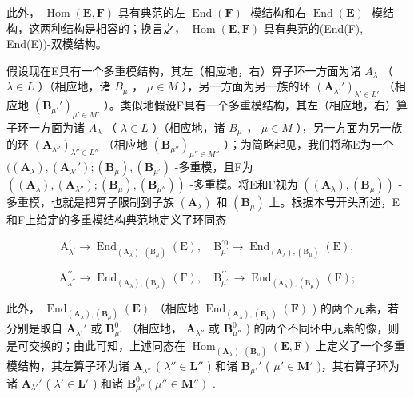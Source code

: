 此外， \(\operatorname{Hom}(\mathbf{E},\mathbf{F})\) 具有典范的左 \(\operatorname{End}(\mathbf{F})\) -模结构和右 \(\operatorname{End}(\mathbf{E})\) -模结构，这两种结构是相容的；换言之， \(\operatorname{Hom}(\mathbf{E},\mathbf{F})\) 具有典范的(End(F), End(E))-双模结构。

假设现在E具有一个多重模结构，其左（相应地，右）算子环一方面为诸 \(A_{\lambda}\) （ \(\lambda \in L\) ）（相应地，诸 \(B_{\mu}\) ， \(\mu \in M\) ），另一方面为另一族的环 \((\mathbf{A}_{\lambda'}')_{\lambda' \in L'}\) （相应地 \((\mathbf{B}_{\mu'}')_{\mu' \in M'}\) ）。类似地假设F具有一个多重模结构，其左（相应地，右）算子环一方面为诸 \(A_{\lambda}\) （ \(\lambda \in L\) ）（相应地，诸 \(B_{\mu}\) ， \(\mu \in M\) ），另一方面为另一族的环 \((\mathbf{A}_{\lambda''})_{\lambda'' \in L''}\) （相应地 \((\mathbf{B}_{\mu''})_{\mu'' \in M''}\) ）；为简略起见，我们将称E为一个 \(((\mathbf{A}_{\lambda}), (\mathbf{A}_{\lambda'}'); (\mathbf{B}_{\mu}), (\mathbf{B}_{\mu'})\) -多重模，且F为 \(((\mathbf{A}_{\lambda}), (\mathbf{A}_{\lambda''}); (\mathbf{B}_{\mu}), (\mathbf{B}_{\mu''}))\) -多重模。将E和F视为 \(((\mathbf{A}_{\lambda}), (\mathbf{B}_{\mu}))\) -多重模，也就是把算子限制到子族 \((\mathbf{A}_{\lambda})\) 和 \((\mathbf{B}_{\mu})\) 上。根据本号开头所述，E和F上给定的多重模结构典范地定义了环同态

\[
\mathrm{A} _ {\lambda^ {\prime}} ^ {\prime} \rightarrow \operatorname{End} _ {(\mathrm{A} _ {\lambda}), (\mathrm{B} _ {\mu})} (\mathrm{E}), \quad \mathrm{B} _ {\mu^ {\prime}} ^ {\prime 0} \rightarrow \operatorname{End} _ {(\mathrm{A} _ {\lambda}), (\mathrm{B} _ {\mu})} (\mathrm{E}),
\]

\[
\mathrm{A} _ {\lambda^ {\prime \prime}} ^ {\prime \prime} \rightarrow \operatorname{End} _ {(\mathrm{A} _ {\lambda}), (\mathrm{B} _ {\mu})} (\mathrm{F}), \quad \mathrm{B} _ {\mu^ {\prime \prime}} ^ {\prime \prime} \rightarrow \operatorname{End} _ {(\mathrm{A} _ {\lambda}), (\mathrm{B} _ {\mu})} (\mathrm{F});
\]

此外， \(\operatorname{End}_{(\mathbf{A}_{\lambda}), (\mathbf{B}_{\mu})}(\mathbf{E})\) （相应地 \(\operatorname{End}_{(\mathbf{A}_{\lambda}), (\mathbf{B}_{\mu})}(\mathbf{F})\) ) 的两个元素，若分别是取自 \(\mathbf{A}_{\lambda'}'\) 或 \(\mathbf{B}_{\mu'}^{0}\) （相应地， \(\mathbf{A}_{\lambda''}\) 或 \(\mathbf{B}_{\mu''}^{0}\) ) 的两个不同环中元素的像，则是可交换的；由此可知，上述同态在 \(\operatorname{Hom}_{(\mathbf{A}_{\lambda}), (\mathbf{B}_{\mu})}(\mathbf{E}, \mathbf{F})\) 上定义了一个多重模结构，其左算子环为诸 \(\mathbf{A}_{\lambda''}\) ( \(\lambda'' \in \mathbf{L}''\) ) 和诸 \(\mathbf{B}_{\mu'}'\) ( \(\mu' \in \mathbf{M}'\) )，其右算子环为诸 \(\mathbf{A}_{\lambda'}'\) ( \(\lambda' \in \mathbf{L}'\) ) 和诸 \(\mathbf{B}_{\mu''}^{0}(\mu'' \in \mathbf{M}'')\) .

